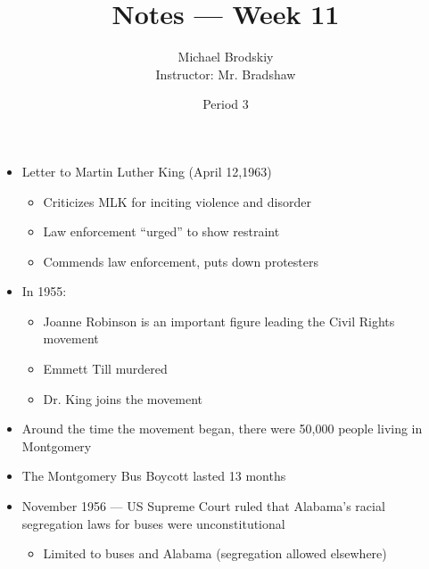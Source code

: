 \documentclass[12pt]{article}
\title{Notes — Week 11}
\date{Period 3}
\author{Michael Brodskiy\\ \small Instructor: Mr. Bradshaw}
\begin{document}
\maketitle

\begin{itemize}

  \item Letter to Martin Luther King (April 12,1963)

    \begin{itemize}

      \item Criticizes MLK for inciting violence and disorder

      \item Law enforcement “urged” to show restraint

      \item Commends law enforcement, puts down protesters 

    \end{itemize}

  \item In 1955:

    \begin{itemize}

      \item Joanne Robinson is an important figure leading the Civil Rights movement

      \item Emmett Till murdered

      \item Dr. King joins the movement

    \end{itemize}

  \item Around the time the movement began, there were 50,000 people living in Montgomery

  \item The Montgomery Bus Boycott lasted 13 months

  \item November 1956 — US Supreme Court ruled that Alabama's racial segregation laws for buses were unconstitutional

    \begin{itemize}

      \item Limited to buses and Alabama (segregation allowed elsewhere)

    \end{itemize}


\end{itemize}
\end{document}
